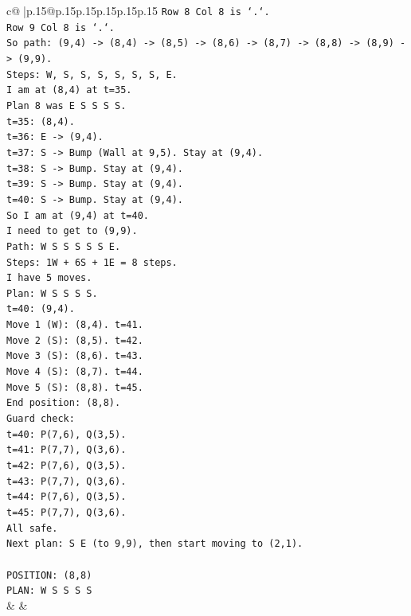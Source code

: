 \documentclass{article}
\begin{document}
{\begin{supertabular}{c@{$\;$}|p{.15\linewidth}@{}p{.15\linewidth}p{.15\linewidth}p{.15\linewidth}p{.15\linewidth}p{.15\linewidth}}
{{{\texttt{Row 8 Col 8 is `.`.} \\
\texttt{Row 9 Col 8 is `.`.} \\
\texttt{So path: (9,4) {-}> (8,4) {-}> (8,5) {-}> (8,6) {-}> (8,7) {-}> (8,8) {-}> (8,9) {-}> (9,9).} \\
\texttt{Steps: W, S, S, S, S, S, S, E.} \\
\texttt{I am at (8,4) at t=35.} \\
\texttt{Plan 8 was E S S S S.} \\
\texttt{t=35: (8,4).} \\
\texttt{t=36: E {-}> (9,4).} \\
\texttt{t=37: S {-}> Bump (Wall at 9,5). Stay at (9,4).} \\
\texttt{t=38: S {-}> Bump. Stay at (9,4).} \\
\texttt{t=39: S {-}> Bump. Stay at (9,4).} \\
\texttt{t=40: S {-}> Bump. Stay at (9,4).} \\
\texttt{So I am at (9,4) at t=40.} \\
\texttt{I need to get to (9,9).} \\
\texttt{Path: W S S S S S E.} \\
\texttt{Steps: 1W + 6S + 1E = 8 steps.} \\
\texttt{I have 5 moves.} \\
\texttt{Plan: W S S S S.} \\
\texttt{t=40: (9,4).} \\
\texttt{Move 1 (W): (8,4). t=41.} \\
\texttt{Move 2 (S): (8,5). t=42.} \\
\texttt{Move 3 (S): (8,6). t=43.} \\
\texttt{Move 4 (S): (8,7). t=44.} \\
\texttt{Move 5 (S): (8,8). t=45.} \\
\texttt{End position: (8,8).} \\
\texttt{Guard check:} \\
\texttt{t=40: P(7,6), Q(3,5).} \\
\texttt{t=41: P(7,7), Q(3,6).} \\
\texttt{t=42: P(7,6), Q(3,5).} \\
\texttt{t=43: P(7,7), Q(3,6).} \\
\texttt{t=44: P(7,6), Q(3,5).} \\
\texttt{t=45: P(7,7), Q(3,6).} \\
\texttt{All safe.} \\
\texttt{Next plan: S E (to 9,9), then start moving to (2,1).} \\
\\ 
\texttt{POSITION: (8,8)} \\
\texttt{PLAN: W S S S S} \\
            }
        }
    }
    & & \\ \\


\end{supertabular}}
\end{document}

